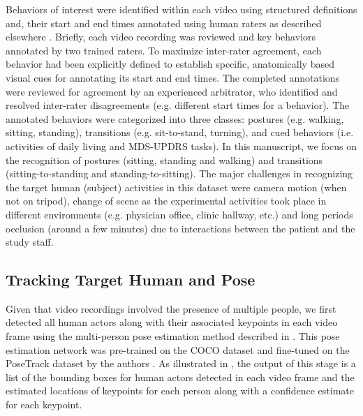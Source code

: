 Behaviors of interest were identified within each video using structured definitions and, their start and end times annotated using human raters as described elsewhere \cite{brooks2019}. Briefly, each video recording was reviewed and key behaviors annotated by two trained raters. To maximize inter-rater agreement, each behavior had been explicitly defined to establish specific, anatomically based visual cues for annotating its start and end times. The completed annotations were reviewed for agreement by an experienced arbitrator, who identified and resolved inter-rater disagreements (e.g. different start times for a behavior). The annotated behaviors were categorized into three classes: postures (e.g. walking, sitting, standing), transitions (e.g. sit-to-stand, turning), and cued behaviors (i.e. activities of daily living and MDS-UPDRS tasks). In this manuscript, we focus on the recognition of postures (sitting, standing and walking) and transitions (sitting-to-standing and standing-to-sitting). The major challenges in recognizing the target human (subject) activities in this dataset were camera motion (when not on tripod), change of scene as the experimental activities took place in different environments (e.g. physician office, clinic hallway, etc.) and long periods occlusion (around a few minutes) due to interactions between the patient and the study staff.

\subsection{Tracking Target Human and Pose} \label{sec:trackResult}
Given that video recordings involved the presence of multiple people, we first detected all human actors along with their associated keypoints in each video frame using the multi-person pose estimation method described in . This pose estimation network was pre-trained on the COCO dataset and fine-tuned on the PoseTrack dataset by the authors \cite{lin2014microsoft,andriluka2018posetrack, girdhar2018detect}. As illustrated in , the output of this stage is a list of the bounding boxes for human actors detected in each video frame and the estimated locations of keypoints for each person along with a confidence estimate for each keypoint.

